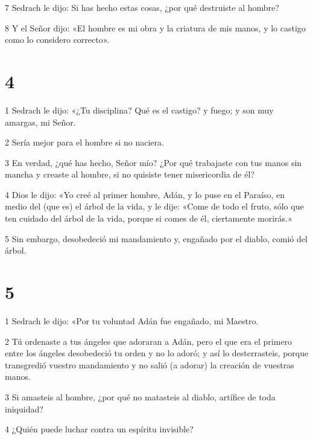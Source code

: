 \par 7 Sedrach le dijo: Si has hecho estas cosas, ¿por qué destruiste al hombre?

\par 8 Y el Señor dijo: «El hombre es mi obra y la criatura de mis manos, y lo castigo como lo considero correcto».

\chapter{4}

\par 1 Sedrach le dijo: «¿Tu disciplina? Qué es el castigo? y fuego; y son muy amargas, mi Señor.

\par 2 Sería mejor para el hombre si no naciera.

\par 3 En verdad, ¿qué has hecho, Señor mío? ¿Por qué trabajaste con tus manos sin mancha y creaste al hombre, si no quisiste tener misericordia de él?

\par 4 Dios le dijo: «Yo creé al primer hombre, Adán, y lo puse en el Paraíso, en medio del (que es) el árbol de la vida, y le dije: «Come de todo el fruto, sólo que ten cuidado del árbol de la vida, porque si comes de él, ciertamente morirás.»

\par 5 Sin embargo, desobedeció mi mandamiento y, engañado por el diablo, comió del árbol.

\chapter{5}

\par 1 Sedrach le dijo: «Por tu voluntad Adán fue engañado, mi Maestro.

\par 2 Tú ordenaste a tus ángeles que adoraran a Adán, pero el que era el primero entre los ángeles desobedeció tu orden y no lo adoró; y así lo desterrasteis, porque transgredió vuestro mandamiento y no salió (a adorar) la creación de vuestras manos.

\par 3 Si amasteis al hombre, ¿por qué no matasteis al diablo, artífice de toda iniquidad?

\par 4 ¿Quién puede luchar contra un espíritu invisible?

